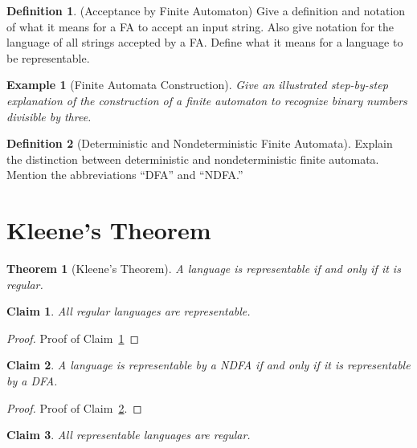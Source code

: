 \documentclass[12 pt, twoside, letterpaper]{article}
\newcommand{\refprop}[1]{Claim~\ref{#1}}
\theoremstyle{definition}
\newtheorem{definition}{Definition}
\theoremstyle{remark}
\theoremstyle{plain}
\newtheorem*{example}{Example}
\newtheorem{theorem}{Theorem}
\newtheorem{claim}{Claim}
\begin{document}
	\begin{definition}(Acceptance by Finite Automaton)
		Give a definition and notation of what it means for a FA to accept an input string.
		Also give notation for the language of all strings accepted by a FA.
		Define what it means for a language to be representable.
	\end{definition}

	\begin{example}[Finite Automata Construction]
		Give an illustrated step-by-step explanation of the construction of a finite automaton to recognize binary numbers divisible by three.
	\end{example}

	\begin{definition}[Deterministic and Nondeterministic Finite Automata]
		Explain the distinction between deterministic and nondeterministic finite automata.
		Mention the abbreviations ``DFA'' and ``NDFA.''
	\end{definition}


\section{Kleene's Theorem} %
\label{sec:kleenes_theorem}

	\begin{theorem}[Kleene's Theorem]
		A language is representable if and only if it is regular.
	\end{theorem}

	\begin{claim}
	\label{prop:regular_languages_representable}
		All regular languages are representable.
	\end{claim}

	\begin{proof}
		Proof of \refprop{prop:regular_languages_representable}
	\end{proof}

	\begin{claim}
	\label{prop:ndfa_dfa_equivalent}
		A language is representable by a NDFA if and only if it is representable by a DFA.
	\end{claim}

	\begin{proof}
	\label{proof:ndfa_dfa_equivalent}
		Proof of \refprop{prop:ndfa_dfa_equivalent}.
	\end{proof}

	\begin{claim}
	\label{prop:representable_languages_regular}
		All representable languages are regular.
	\end{claim}
\end{document}
